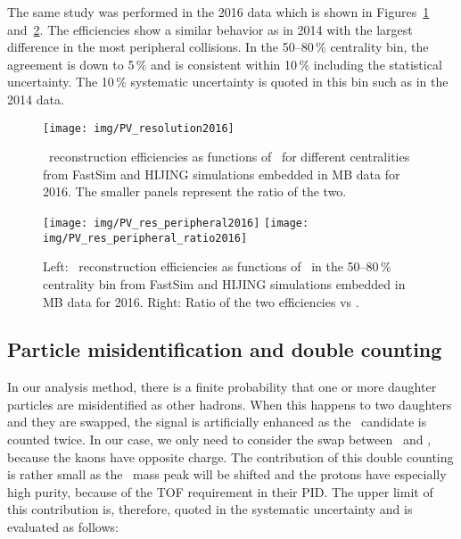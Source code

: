 The same study was performed in the 2016 data which is shown in Figures~\ref{PV_resolution2016} and~\ref{PV_peripheral2016}\@. The efficiencies show a similar behavior as in 2014 with the largest difference in the most peripheral collisions. In the 50--80$\,\%$ centrality bin, the agreement is down to 5$\,\%$ and is consistent within 10$\,\%$ including the statistical uncertainty. The 10$\,\%$ systematic uncertainty is quoted in this bin such as in the 2014 data.

\begin{figure}[!htb]
\centering
\texttt{[image: img/PV\_resolution2016]}

\caption[\Lambdac\ reconstruction efficiencies from FastSim and HIJING simulations embedded in MB data for 2016.]{\label{PV_resolution2016} \Lambdac\ reconstruction efficiencies as functions of \pt\ for different centralities from FastSim and HIJING simulations embedded in MB data for 2016. The smaller panels represent the ratio of the two.}
\end{figure}

\begin{figure}[!htb]
\centering
\texttt{[image: img/PV\_res\_peripheral2016]}
\texttt{[image: img/PV\_res\_peripheral\_ratio2016]}
\caption[\Lambdac\ reconstruction efficiencies from FastSim and HIJING simulations embedded in MB data for 2016 and ratio of the two efficiencies.]{\label{PV_peripheral2016} Left: \Lambdac\ reconstruction efficiencies as functions of \pt\ in the 50--80\,\% centrality bin from FastSim and HIJING simulations embedded in MB data for 2016. Right: Ratio of the two efficiencies vs \pt.}
\end{figure}


\subsection{Particle misidentification and double counting}
In our analysis method, there is a finite probability that one or more daughter particles are misidentified as other hadrons. When this happens to two daughters and they are swapped, the signal is artificially enhanced as the \Lambdac\ candidate is counted twice. In our case, we only need to consider the swap between \ppm\ and \pipm, because the kaons have opposite charge. The contribution of this double counting is rather small as the \Lambdac\ mass peak will be shifted and the protons have especially high purity, because of the TOF requirement in their PID\@. The upper limit of this contribution is, therefore, quoted in the systematic uncertainty and is evaluated as follows:

